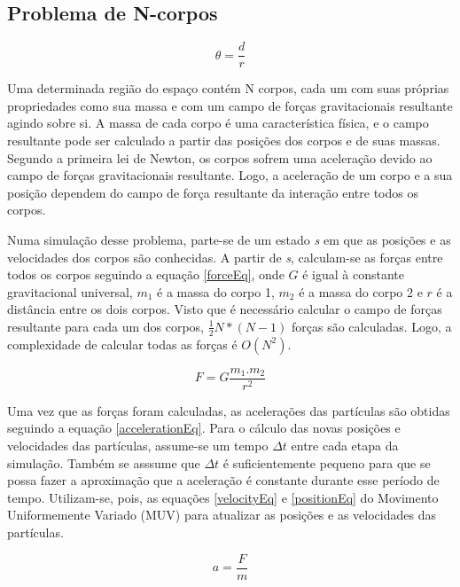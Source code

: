 \documentclass[rel_mlp]{iiufrgs}
\begin{document}
\subsection{Problema de N-corpos}

\begin{equation}
\label{theta}
\theta=\frac{d}{r}
\end{equation}

Uma determinada região do espaço contém N corpos, cada um com suas próprias propriedades como sua massa e com um campo de forças gravitacionais resultante agindo sobre si. A massa de cada corpo é uma característica física, e o campo resultante pode ser calculado a partir das posições dos corpos e de suas massas. Segundo a primeira lei de Newton, os corpos sofrem uma aceleração devido ao campo de forças gravitacionais resultante. Logo, a aceleração de um corpo e a sua posição dependem do campo de força resultante da interação entre todos os corpos.

Numa simulação desse problema, parte-se de um estado \textit{s} em que as posições e as velocidades dos corpos são conhecidas. A partir de \textit{s}, calculam-se as forças entre todos os corpos seguindo a equação \ref{forceEq}, onde $G$ é igual à constante gravitacional universal, $m_1$ é a massa do corpo 1, $m_2$ é a massa do corpo 2 e $r$ é a distância entre os dois corpos. Visto que é necessário calcular o campo de forças resultante para cada um dos corpos, $\frac{1}{2}N*(N-1)$ forças são calculadas. Logo, a complexidade de calcular todas as forças é $O(N^2)$.

\begin{equation}
\label{forceEq}
F=G\frac{m_1.m_2}{r^2}
\end{equation}

Uma vez que as forças foram calculadas, as acelerações das partículas são obtidas seguindo a equação \ref{accelerationEq}. Para o cálculo das novas posições e velocidades das partículas, assume-se um tempo $\Delta t$ entre cada etapa da simulação. Também se asssume que $\Delta t$ é suficientemente pequeno para que se possa fazer a aproximação que a aceleração é constante durante esse período de tempo. Utilizam-se, pois, as equações \ref{velocityEq} e \ref{positionEq} do Movimento Uniformemente Variado (MUV) para atualizar as posições e as velocidades das partículas.

\begin{equation}
\label{accelerationEq}
a=\frac{F}{m}
\end{equation}
\end{document}
